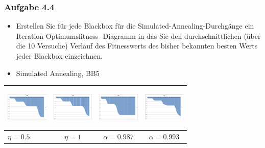 \documentclass[xcolor=pdftex,dvipsnames,table]{beamer}
\begin{document}
\begin{frame}
  \frametitle{Aufgabe 4.4}
  \begin{itemize}
  		\item Erstellen Sie für jede Blackbox für die Simulated-Annealing-Durchgänge ein Iteration-Optimumsfitness-
Diagramm in das Sie den durchschnittlichen (über die 10 Versuche) Verlauf des Fitnesswerts
des bisher bekannten besten Werts jeder Blackbox einzeichnen.
\item Simulated Annealing, BB5
  \end{itemize}

\begin{tabular}{|l|c|c|c|} 
      \rowcolor[HTML]{CCD6CC}	
      \includegraphics[width=20mm, height=20mm]{img/excel_avg_and_charts/pic/BB5_SimulatedAnnealing_t1_eta_0_5.png} 
 &  \includegraphics[width=20mm, height=20mm]{img/excel_avg_and_charts/pic/BB5_SimulatedAnnealing_t1_eta_1.png} 
 &  \includegraphics[width=20mm, height=20mm]{img/excel_avg_and_charts/pic/BB5_SimulatedAnnealing_t2_alpha__987.png}
 &  \includegraphics[width=20mm, height=20mm]{img/excel_avg_and_charts/pic/BB5_SimulatedAnnealing_t2_alpha_0_993.png} \\ \hline
      \rowcolor[HTML]{A6BFB9} $\eta = 0.5$ & $\eta = 1$ & $\alpha = 0.987$ & $\alpha = 0.993$ \\ \hline
    \end{tabular}
    
\end{frame}
\end{document}
